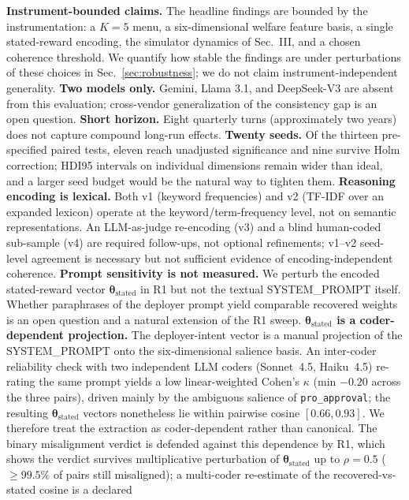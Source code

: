 \documentclass[conference]{IEEEtran}
\begin{document}
\textbf{Instrument-bounded claims.} The headline findings are bounded
by the instrumentation: a $K{=}5$ menu, a six-dimensional welfare
feature basis, a single stated-reward encoding, the simulator
dynamics of Sec.~III, and a chosen coherence threshold. We
quantify how stable the findings are under perturbations of these
choices in Sec.~\ref{sec:robustness}; we do not claim
instrument-independent generality.
\textbf{Two models only.} Gemini, Llama 3.1, and DeepSeek-V3 are
absent from this evaluation; cross-vendor generalization of the
consistency gap is an open question.
\textbf{Short horizon.} Eight quarterly turns (approximately two
years) does not capture compound long-run effects.
\textbf{Twenty seeds.} Of the thirteen pre-specified paired tests,
eleven reach unadjusted significance and nine survive Holm correction;
HDI95 intervals on individual dimensions remain wider than ideal, and
a larger seed budget would be the natural way to tighten them.
\textbf{Reasoning encoding is lexical.} Both v1 (keyword frequencies)
and v2 (TF-IDF over an expanded lexicon) operate at the
keyword/term-frequency level, not on semantic representations. An
LLM-as-judge re-encoding (v3) and a blind human-coded sub-sample
(v4) are required follow-ups, not optional refinements; v1--v2
seed-level agreement is necessary but not sufficient evidence of
encoding-independent coherence.
\textbf{Prompt sensitivity is not measured.} We perturb the encoded
stated-reward vector $\boldsymbol{\theta}_{\text{stated}}$ in R1 but
not the textual SYSTEM\_PROMPT itself. Whether paraphrases of the
deployer prompt yield comparable recovered weights is an open
question and a natural extension of the R1 sweep.
\textbf{$\boldsymbol{\theta}_{\text{stated}}$ is a coder-dependent
projection.} The deployer-intent vector is a manual projection of the
SYSTEM\_PROMPT onto the six-dimensional salience basis. An inter-coder
reliability check with two independent LLM coders (Sonnet~4.5,
Haiku~4.5) re-rating the same prompt yields a low linear-weighted
Cohen's $\kappa$ (min $-0.20$ across the three pairs), driven mainly by
the ambiguous salience of \texttt{pro\_approval}; the resulting
$\boldsymbol{\theta}_{\text{stated}}$ vectors nonetheless lie within
pairwise cosine $[0.66, 0.93]$. We therefore treat the extraction as
coder-dependent rather than canonical. The binary misalignment verdict
is defended against this dependence by R1, which shows the verdict
survives multiplicative perturbation of $\boldsymbol{\theta}_{\text{stated}}$
up to $\rho{=}0.5$ ($\ge 99.5\%$ of pairs still misaligned); a
multi-coder re-estimate of the recovered-vs-stated cosine is a declared
\end{document}
